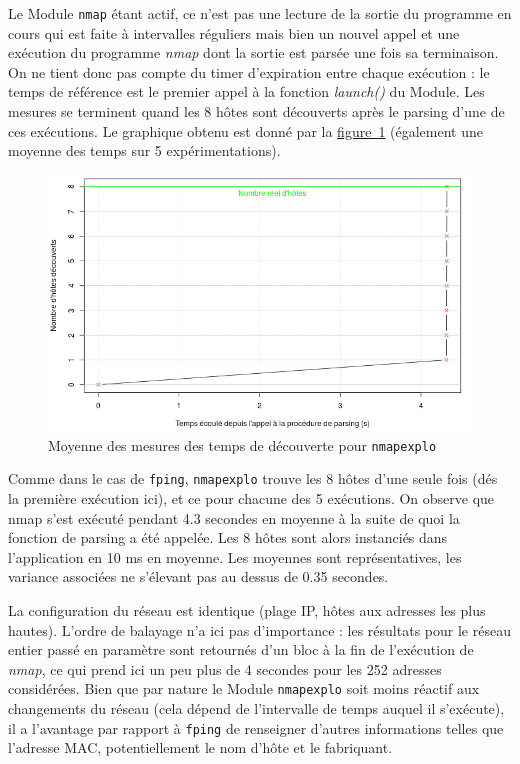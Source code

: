 \documentclass[]{article}
\newcommand{\minit}[1]{\noindent{\small\textbf{ \underline{#1}}}\vspace{0.2cm}}
\newcommand{\wordlink}[2]{\hyperref[#1]{#2~\ref{#1}}}
\begin{document}
\minit{Mesures pour \texttt{nmapexplo}}
\vspace{0.1cm}

\par Le Module \texttt{nmap} étant actif, ce n'est pas une lecture de la sortie du programme en cours qui est faite à intervalles réguliers mais bien un nouvel appel et une exécution du programme \textit{nmap} dont la sortie est parsée une fois sa terminaison. On ne tient donc pas compte du timer d'expiration entre chaque exécution : le temps de référence est le premier appel à la fonction \textit{launch()} du Module. Les mesures se terminent quand les 8 hôtes sont découverts après le parsing d'une de ces exécutions. Le graphique obtenu est donné par la \wordlink{explomean}{figure} (également une moyenne des temps sur 5 expérimentations).\\

\begin{figure}[!ht]
\centering
     \includegraphics[width=0.75\linewidth]{explomean}
     \caption{Moyenne des mesures des temps de découverte pour \texttt{nmapexplo}}
     \label{explomean}
\end{figure}

\vspace{0.1cm}

\par Comme dans le cas de \texttt{fping}, \texttt{nmapexplo} trouve les 8 hôtes d'une seule fois (dés la première exécution ici), et ce pour chacune des 5 exécutions. On observe que nmap s'est exécuté pendant 4.3 secondes en moyenne à la suite de quoi la fonction de parsing a été appelée. Les 8 hôtes sont alors instanciés dans l'application en 10 ms en moyenne. Les moyennes sont représentatives, les variance associées ne s'élevant pas au dessus de 0.35 secondes.\\

\par La configuration du réseau est identique (plage IP, hôtes aux adresses les plus hautes). L'ordre de balayage n'a ici pas d'importance : les résultats pour le réseau entier passé en paramètre sont retournés d'un bloc à la fin de l'exécution de \textit{nmap}, ce qui prend ici un peu plus de 4 secondes pour les 252 adresses considérées. Bien que par nature le Module \texttt{nmapexplo} soit moins réactif aux changements du réseau (cela dépend de l'intervalle de temps auquel il s'exécute), il a l'avantage par rapport à \texttt{fping} de renseigner d'autres informations telles que l'adresse MAC, potentiellement le nom d'hôte et le fabriquant.
\end{document}
